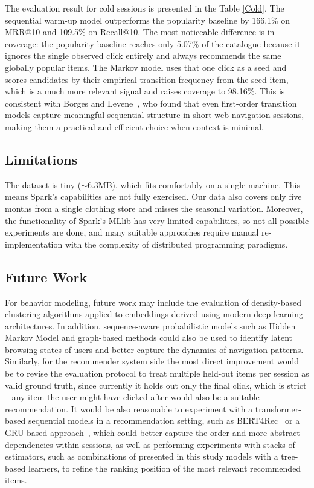 \documentclass[a4paper,oneside,12pt]{book}
\begin{document}
The evaluation result for cold sessions is presented in the Table \ref{Cold}. The sequential warm-up model outperforms the popularity baseline by 166.1\%
on MRR@10 and 109.5\% on Recall@10.
The most noticeable difference is in coverage: the popularity baseline
reaches only 5.07\% of the catalogue because it ignores the single observed
click entirely and always recommends the same globally popular items.
The Markov model uses that one click as a seed and scores candidates by
their empirical transition frequency from the seed item, which is a much
more relevant signal and raises coverage to 98.16\%.
This is consistent with Borges and Levene~\cite{VLMMBorges}, who found that
even first-order transition models capture meaningful sequential structure in
short web navigation sessions, making them a practical and efficient choice
when context is minimal.


\subsection{Limitations}

The dataset is tiny ($\sim$6.3MB), which fits comfortably on a single machine. This means Spark's capabilities are not fully exercised. Our data also covers only five months from a single clothing store and misses the seasonal variation. Moreover, the functionality of Spark's MLlib has very limited capabilities, so not all possible experiments are done, and many suitable approaches require manual re-implementation with the complexity of distributed programming paradigms.





\subsection{Future Work}
For behavior modeling, future work may include the evaluation of density-based clustering algorithms applied to embeddings derived using modern deep learning architectures. In addition, sequence-aware probabilistic models such as Hidden Markov Model and graph-based methods could also be used to identify latent browsing states of users and better capture the dynamics of navigation patterns. Similarly, for the recommender system side the most direct improvement would be to revise the evaluation protocol to treat multiple held-out items per session as valid ground truth, since currently it holds out only the final click, which is strict -- any item the user might have clicked after would also be a suitable recommendation. It would be also reasonable to experiment with a transformer-based sequential models in a recommendation setting, such as BERT4Rec~\cite{sun2019bert4rec} or a GRU-based approach~\cite{hidasi2016session}, which could better capture the order and more abstract dependencies within sessions, as well as performing experiments with stacks of estimators, such as combinations of presented in this study models with a tree-based learners, to refine the ranking position of the most relevant recommended items.
\end{document}
